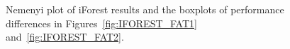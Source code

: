 \documentclass[letter,12pt]{article}
\begin{document}
\begin{figure}[!p]
  \centering
  \hfill
  \caption{Nemenyi plot of iForest results and the boxplots of performance differences in Figures~\ref{fig:IFOREST_FAT1} and~\ref{fig:IFOREST_FAT2}.}
  \label{fig:IFOREST_FAT}
\end{figure}
\end{document}
